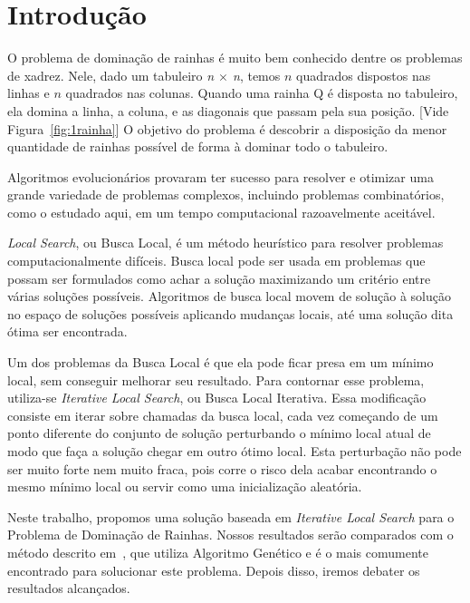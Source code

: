 \documentclass[
	article,			%
	11pt,				%
	oneside,			%
	a4paper,			%
	english,			%
	brazil,				%
	sumario=tradicional
	]{abntex2}
\begin{document}
\textual

\section{Introdução}

O problema de dominação de rainhas é muito bem conhecido dentre os problemas de xadrez. Nele, dado um tabuleiro \textit{n $\times$ n}, temos $n$ quadrados dispostos nas linhas e $n$ quadrados nas colunas. Quando uma rainha Q é disposta no tabuleiro, ela domina a linha, a coluna, e as diagonais que passam pela sua posição. [Vide Figura~\ref{fig:1rainha}] O objetivo do problema é descobrir a disposição da menor quantidade de rainhas possível de forma à dominar todo o tabuleiro.

 Algoritmos evolucionários provaram ter sucesso para resolver e otimizar uma grande variedade de problemas complexos, incluindo problemas combinatórios, como o estudado aqui, em um tempo computacional razoavelmente aceitável.~\cite{doerr2011evolutionary}

\textit{Local Search}, ou Busca Local, é um método heurístico para resolver problemas computacionalmente difíceis. Busca local pode ser usada em problemas que possam ser formulados como achar a solução maximizando um critério entre várias soluções possíveis. Algoritmos de busca local movem de solução à solução no espaço de soluções possíveis aplicando mudanças locais, até uma solução dita ótima ser encontrada.~\cite{hoos2004stochastic}

Um dos problemas da Busca Local é que ela pode ficar presa em um mínimo local, sem conseguir melhorar seu resultado. Para contornar esse problema, utiliza-se \textit{Iterative Local Search}, ou Busca Local Iterativa. Essa modificação consiste em iterar sobre chamadas da busca local, cada vez começando de um ponto diferente do conjunto de solução perturbando o mínimo local atual de modo que faça a solução chegar em outro ótimo local. Esta perturbação não pode ser muito forte nem muito fraca, pois corre o risco dela acabar encontrando o mesmo mínimo local ou servir como uma inicialização aleatória.~\cite{lourencco2010iterated}

  Neste trabalho, propomos uma solução baseada em \textit{Iterative Local Search} para o Problema de Dominação de Rainhas. Nossos resultados serão comparados com o método descrito em~\cite{alharbi2017genetic}, que utiliza Algoritmo Genético e é o mais comumente encontrado para solucionar este problema. Depois disso, iremos debater os resultados alcançados.
\end{document}
